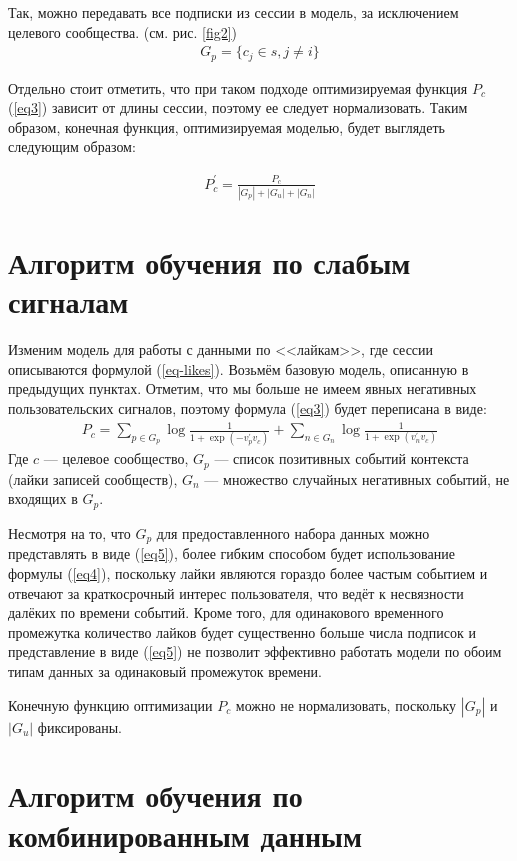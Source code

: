 \documentclass[times,specification,annotation]{itmo-student-thesis}
\begin{document}
Так, можно передавать все подписки из сессии в модель, за исключением целевого сообщества. (см. рис. \ref{fig2})
\begin{align}
G_p =\{c_j \in s, j \ne i\} \label{eq5}
\end{align}

Отдельно стоит отметить, что при таком подходе оптимизируемая функция $P_c$ (\ref{eq3}) зависит от длины сессии, поэтому ее следует нормализовать. Таким образом, конечная функция, оптимизируемая моделью, будет выглядеть следующим образом: 

\begin{align}
P_c^{'} = \frac{P_c}{|G_p| + |G_u| + |G_n|} \label{eq6}
\end{align}

\section{Алгоритм обучения по слабым сигналам}\label{sec:algo-likes}

Изменим модель для работы с данными по <<лайкам>>, где сессии описываются формулой (\ref{eq-likes}). Возьмём базовую модель, описанную в предыдущих пунктах. Отметим, что мы больше не имеем явных негативных пользовательских сигналов, поэтому формула (\ref{eq3}) будет переписана в виде:
\begin{align}
P_c = \sum_{p \in G_p} \log \frac{1}{1 + \exp(-v_p^{'}v_c)} + \sum_{n \in G_n} \log \frac{1}{1 + \exp(v_n^{'}v_c)} \label{eq7}
 \end{align}
Где $c$ --- целевое сообщество, $G_p$ --- список позитивных событий
контекста (лайки записей сообществ), $G_n$ --- множество случайных негативных событий, не входящих в $G_p$. 

Несмотря на то, что $G_p$ для предоставленного набора данных можно представлять в виде (\ref{eq5}), более гибким способом будет использование формулы (\ref{eq4}), поскольку лайки являются гораздо более частым событием и отвечают за краткосрочный интерес пользователя, что ведёт к несвязности далёких по времени событий. Кроме того, для одинакового временного промежутка количество лайков будет существенно больше числа подписок и представление в виде (\ref{eq5}) не позволит эффективно работать модели по обоим типам данных за одинаковый промежуток времени. 

Конечную функцию оптимизации  $P_c$ можно не нормализовать, поскольку $|G_p|$ и $|G_u|$ фиксированы.

\section{Алгоритм обучения по комбинированным данным}\label{sec:algo-combined}
\end{document}
